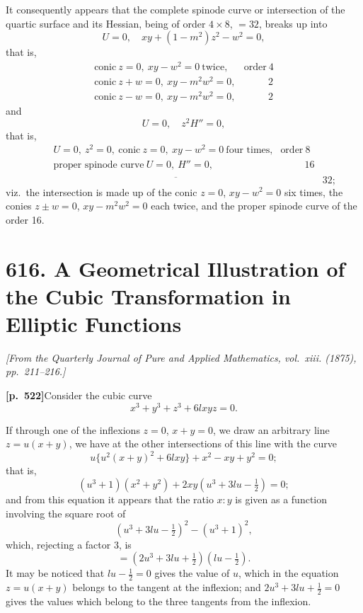 \documentclass[11pt,a4paper]{article}
\begin{document}
It consequently appears that the complete spinode curve or intersection of the quartic surface and its Hessian, being of order $4 \times 8$, $= 32$, breaks up into
\[
U = 0,\quad xy + (1 - m^{2})z^{2} - w^{2} = 0,
\]
that is,
\[
\begin{array}{ll}
\text{conic}\ z = 0,\ xy - w^{2} = 0\ \text{twice,} & \text{order}\ 4 \\
\text{conic}\ z + w = 0,\ xy - m^{2}w^{2} = 0, & \quad\quad\ \ 2 \\
\text{conic}\ z - w = 0,\ xy - m^{2}w^{2} = 0, & \quad\quad\ \ 2
\end{array}
\]
and
\[
U = 0,\quad z^{2}H'' = 0,
\]
that is,
\[
\begin{array}{ll}
U = 0,\ z^{2} = 0,\ \text{conic}\ z = 0,\ xy - w^{2} = 0\ \text{four times,} & \text{order}\ 8 \\
\text{proper spinode curve}\ U = 0,\ H'' = 0, & \quad\quad\ \ 16 \\
\end{array}
\]
\[
\overline{\phantom{xxxxxxxxxxxxxxxxxxxxxxxxxxxxxxxxxxxxxxxxxxxxxxxxxxx}}\ 32;
\]
viz.\ the intersection is made up of the conic $z = 0$, $xy - w^{2} = 0$ six times, the conies $z \pm w = 0$, $xy - m^{2}w^{2} = 0$ each twice, and the proper spinode curve of the order 16.

\newpage

\section*{\textbf{616.} A Geometrical Illustration of the Cubic Transformation in Elliptic Functions}

\textit{[From the Quarterly Journal of Pure and Applied Mathematics, vol.~xiii. (1875), pp.~211--216.]}

\bigskip

\noindent\textbf{[p.~522]}\quad Consider the cubic curve
\[
x^{3} + y^{3} + z^{3} + 6lxyz = 0.
\]

If through one of the inflexions $z = 0$, $x + y = 0$, we draw an arbitrary line $z = u(x + y)$, we have at the other intersections of this line with the curve
\[
u\{u^{2}(x + y)^{2} + 6lxy\} + x^{2} - xy + y^{2} = 0;
\]
that is,
\[
(u^{3} + 1)(x^{2} + y^{2}) + 2xy(u^{3} + 3lu - \tfrac{1}{2}) = 0;
\]
and from this equation it appears that the ratio $x : y$ is given as a function involving the square root of
\[
(u^{3} + 3lu - \tfrac{1}{2})^{2} - (u^{3} + 1)^{2},
\]
which, rejecting a factor 3, is
\[
= (2u^{3} + 3lu + \tfrac{1}{2})(lu - \tfrac{1}{2}).
\]
It may be noticed that $lu - \tfrac{1}{2} = 0$ gives the value of $u$, which in the equation $z = u(x + y)$ belongs to the tangent at the inflexion; and $2u^{3} + 3lu + \tfrac{1}{2} = 0$ gives the values which belong to the three tangents from the inflexion.
\end{document}
